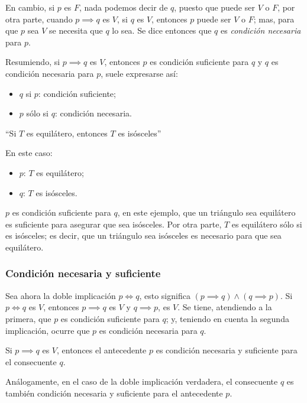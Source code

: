 En cambio, si $p$ es $F$, nada podemos decir de $q$, puesto que puede ser $V$ o $F$, por otra parte, cuando $p \implies q$ es $V$, si $q$ es $V$, entonces $p$ puede ser $V$ o $F$; mas, para que $p$ sea $V$ se necesita que $q$ lo sea. Se dice entonces que $q$ es \textit{condición necesaria} para $p$.

Resumiendo, si $p \implies q$ es $V$, entonces $p$ es condición suficiente para $q$ y $q$ es condición necesaria para $p$, suele expresarse así:

\begin{itemize}
	\item $q$ si $p$: condición suficiente;
	\item $p$ sólo si $q$: condición necesaria.
\end{itemize}

\begin{fmd-example}
	``Si $T$ es equilátero, entonces $T$ es isósceles''
	
	En este caso:
	\begin{itemize}
		\item $p$: $T$ es equilátero;
		\item $q$: $T$ es isósceles.
	\end{itemize}
	
	$p$ es condición suficiente para $q$, en este ejemplo, que un triángulo sea equilátero es suficiente para asegurar que sea isósceles. Por otra parte, $T$ es equilátero sólo si es isósceles; es decir, que un triángulo sea isósceles es necesario para que sea equilátero.
\end{fmd-example}

\subsubsection{Condición necesaria y suficiente}

Sea ahora la doble implicación $p \iff q$, esto significa $(p \implies q) \land (q \implies p)$. Si $p \iff q$ es $V$, entonces $p \implies q$ es $V$ y $q \implies p$, es $V$. Se tiene, atendiendo a la primera, que $p$ es condición suficiente para $q$; y, teniendo en cuenta la segunda implicación, ocurre que $p$ es condición necesaria para $q$.

Si $p \implies q$ es $V$, entonces el antecedente $p$ es condición necesaria y suficiente para el consecuente $q$.

Análogamente, en el caso de la doble implicación verdadera, el consecuente $q$ es también condición necesaria y suficiente para el antecedente $p$.

